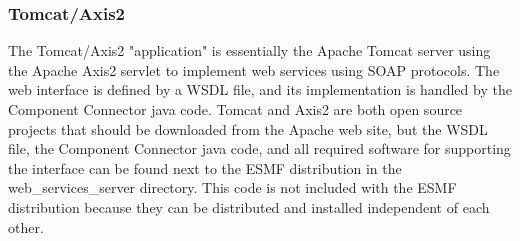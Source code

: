 \subsubsection{Tomcat/Axis2}

The Tomcat/Axis2 "application" is essentially the Apache Tomcat server using 
the Apache Axis2 servlet to  implement web services using SOAP protocols. The web 
interface is defined by a WSDL file, and its implementation is handled by the Component 
Connector java code.  Tomcat and Axis2 are both open source projects that should be 
downloaded from the Apache web site, but the WSDL file, the Component Connector java 
code, and all required software for supporting the interface can be found next to the 
ESMF distribution in the web\_services\_server directory. This code is not included with 
the ESMF distribution because they can be distributed and installed independent of each other.

